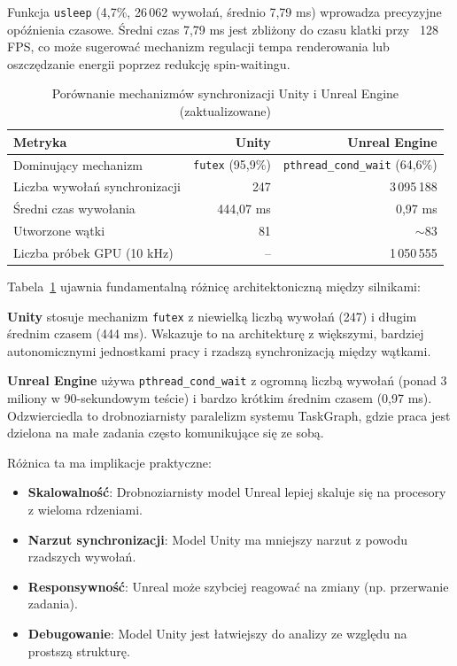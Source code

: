 Funkcja \texttt{usleep} (4,7\%, 26\,062 wywołań, średnio 7,79 ms) wprowadza precyzyjne opóźnienia czasowe. Średni czas 7,79 ms jest zbliżony do 
czasu klatki przy ~128 FPS, co może sugerować mechanizm regulacji tempa renderowania lub oszczędzanie energii poprzez redukcję spin-waitingu.

\begin{table}[H]
\centering
\caption{Porównanie mechanizmów synchronizacji Unity i Unreal Engine (zaktualizowane)}
\label{tab:sync-comparison}
\small
\begin{tabular}{|l|r|r|}
\hline
\textbf{Metryka} & \textbf{Unity} & \textbf{Unreal Engine} \\
\hline
Dominujący mechanizm & \texttt{futex} (95,9\%) & \texttt{pthread\_cond\_wait} (64,6\%) \\
Liczba wywołań synchronizacji & 247 & 3\,095\,188 \\
Średni czas wywołania & 444,07 ms & 0,97 ms \\
Utworzone wątki & 81 & $\sim$83 \\
Liczba próbek GPU (10 kHz) & -- & 1\,050\,555 \\
\hline
\end{tabular}
\end{table}


Tabela~\ref{tab:sync-comparison} ujawnia fundamentalną różnicę architektoniczną między silnikami:

\textbf{Unity} stosuje mechanizm \texttt{futex} z niewielką liczbą wywołań (247) i 
długim średnim czasem (444 ms). Wskazuje to na architekturę z 
większymi, bardziej autonomicznymi jednostkami pracy i rzadszą synchronizacją między wątkami.

\textbf{Unreal Engine} używa \texttt{pthread\_cond\_wait} z ogromną liczbą wywołań 
(ponad 3 miliony w 90-sekundowym teście) i bardzo krótkim średnim 
czasem (0,97 ms). Odzwierciedla to drobnoziarnisty paralelizm systemu TaskGraph, gdzie praca jest dzielona na małe zadania często komunikujące się ze 
sobą.

Różnica ta ma implikacje praktyczne:
\begin{itemize}
    \item \textbf{Skalowalność}: Drobnoziarnisty model Unreal lepiej skaluje się na procesory z wieloma rdzeniami.
    \item \textbf{Narzut synchronizacji}: Model Unity ma mniejszy narzut z powodu rzadszych wywołań.
    \item \textbf{Responsywność}: Unreal może szybciej reagować na zmiany (np. przerwanie zadania).
    \item \textbf{Debugowanie}: Model Unity jest łatwiejszy do analizy ze względu na prostszą strukturę.
\end{itemize}


